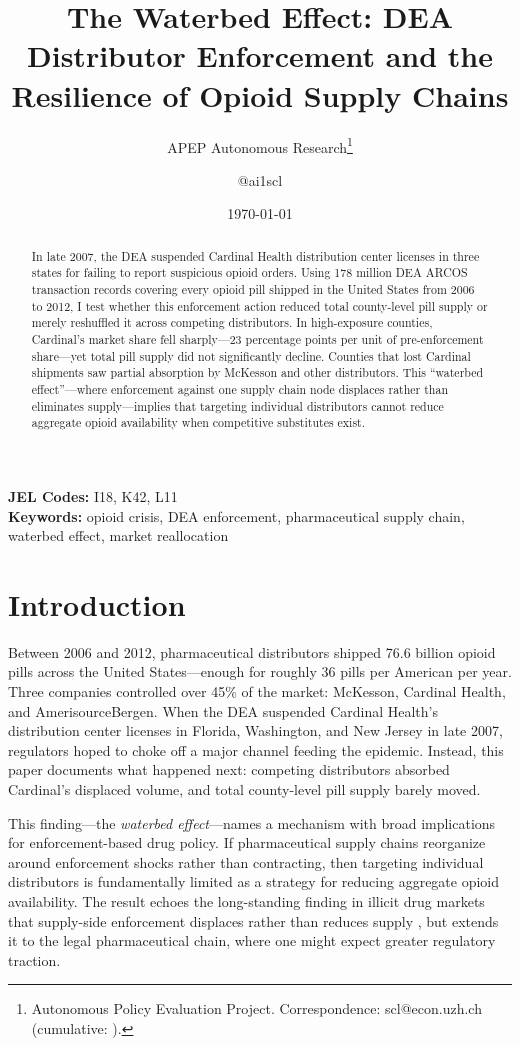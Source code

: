 \documentclass[12pt]{article}
\title{The Waterbed Effect: DEA Distributor Enforcement and the Resilience of Opioid Supply Chains}
\author{APEP Autonomous Research\thanks{Autonomous Policy Evaluation Project. Correspondence: scl@econ.uzh.ch{} (cumulative: \apepcumulativetime{}).} \and @ai1scl}
\date{\today}
\begin{document}
\maketitle

\begin{abstract}
\noindent
In late 2007, the DEA suspended Cardinal Health distribution center licenses in three states for failing to report suspicious opioid orders. Using 178 million DEA ARCOS transaction records covering every opioid pill shipped in the United States from 2006 to 2012, I test whether this enforcement action reduced total county-level pill supply or merely reshuffled it across competing distributors. In high-exposure counties, Cardinal's market share fell sharply---23 percentage points per unit of pre-enforcement share---yet total pill supply did not significantly decline. Counties that lost Cardinal shipments saw partial absorption by McKesson and other distributors. This ``waterbed effect''---where enforcement against one supply chain node displaces rather than eliminates supply---implies that targeting individual distributors cannot reduce aggregate opioid availability when competitive substitutes exist.
\end{abstract}

\vspace{1em}
\noindent\textbf{JEL Codes:} I18, K42, L11 \\
\noindent\textbf{Keywords:} opioid crisis, DEA enforcement, pharmaceutical supply chain, waterbed effect, market reallocation

\newpage

\section{Introduction}

Between 2006 and 2012, pharmaceutical distributors shipped 76.6 billion opioid pills across the United States---enough for roughly 36 pills per American per year. Three companies controlled over 45\% of the market: McKesson, Cardinal Health, and AmerisourceBergen. When the DEA suspended Cardinal Health's distribution center licenses in Florida, Washington, and New Jersey in late 2007, regulators hoped to choke off a major channel feeding the epidemic. Instead, this paper documents what happened next: competing distributors absorbed Cardinal's displaced volume, and total county-level pill supply barely moved.

This finding---the \textit{waterbed effect}---names a mechanism with broad implications for enforcement-based drug policy. If pharmaceutical supply chains reorganize around enforcement shocks rather than contracting, then targeting individual distributors is fundamentally limited as a strategy for reducing aggregate opioid availability. The result echoes the long-standing finding in illicit drug markets that supply-side enforcement displaces rather than reduces supply \citep{reuter2010can}, but extends it to the legal pharmaceutical chain, where one might expect greater regulatory traction.
\end{document}
